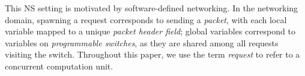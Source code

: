 %
%
This NS setting is motivated by software-defined networking. In the networking domain, spawning a request corresponds to sending a \textit{packet}, with each local variable mapped to a unique \textit{packet header field}; global variables correspond to variables on \textit{programmable switches}, as they are shared among all requests visiting the switch. Throughout this paper, we use the term \emph{request} to refer to a concurrent computation unit. 
    
